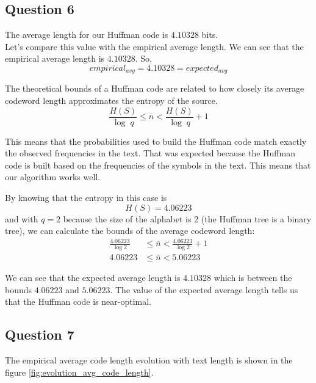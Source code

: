 \documentclass[]{template}
\begin{document}
    \subsection{Question 6}

    The average length for our Huffman code is $4.10328$ bits. \\

    \noindent
    Let's compare this value with the empirical average length.
    We can see that the empirical average length is $4.10328$. So,\\
    \[
        empirical_{avg} = 4.10328 = expected_{avg}
    \]


    \noindent
    The theoretical bounds of a Huffman code are related to how closely its average codeword 
    length approximates the entropy of the source.
    \[
        \frac{H(S)}{\log \; q} \leq \overline{n} < \frac{H(S)}{\log \; q} + 1 
    \]

    \noindent
    This means that the probabilities used to build the Huffman code match exactly the observed frequencies in the text.
    That was expected because the Huffman code is built based on the frequencies of the symbols in the text.
    This means that our algorithm works well.

    \noindent
    By knowing that the entropy in this case is \[H(S) = 4.06223\] and 
    with $q = 2$ because the size of the alphabet is 2 (the Huffman tree is a binary tree), we can calculate the bounds of the average codeword length:
    \begin{align*}
        \frac{4.06223}{\log 2} &\leq \overline{n} < \frac{4.06223}{\log 2} + 1 \\
        4.06223 &\leq \overline{n} < 5.06223
    \end{align*}
    
    \noindent
    We can see that the expected average length is $4.10328$ which is between the bounds $4.06223$ and $5.06223$.
    The value of the expected average length tells us that the Huffman code is near-optimal.

    \subsection{Question 7}

    The empirical average code length evolution with text length is shown in the figure 
    \ref{fig:evolution_avg_code_length}.\\
    
\end{document}
